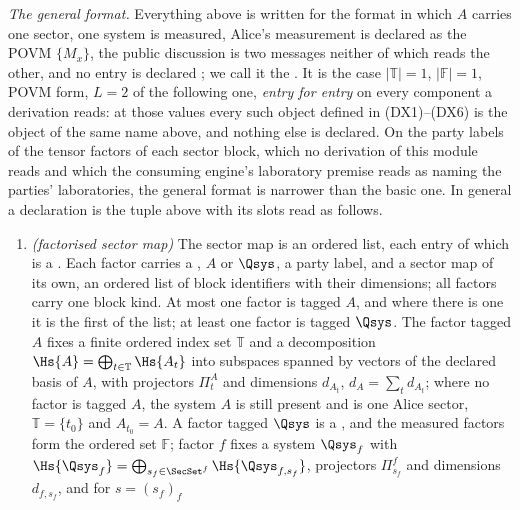 \begin{definition}
\emph{The general format.} Everything above is written for the format in
which $A$ carries one sector, one system is measured, Alice's measurement is
declared as the POVM $\{M_x\}$, the public discussion is two messages neither
of which reads the other, and no entry is declared ; we
call it the
.
It is the case $|\mathbb{T}|=1$, $|\mathbb{F}|=1$, POVM form, $L=2$ of the
following one, \emph{entry for entry} on every component a derivation reads:
at those values every such object defined in (DX1)--(DX6) is the object of
the same name above, and nothing else is declared. On the party labels of the
tensor factors of each sector block, which no derivation of this module reads
and which the consuming engine's laboratory premise reads as naming the
parties' laboratories, the general format is narrower than the basic one. In general a declaration is the
tuple above with its slots read as follows.
\begin{enumerate}[label=(DX\arabic*),leftmargin=3.2em]
\item \emph{(factorised sector map)} The sector map is an ordered list, each
entry of which is a
.
Each factor carries a
,
$A$ or $\Qsys$, a party label, and a sector map of its own, an ordered list of
block identifiers with their dimensions; all factors carry one block kind. At
most one factor is tagged $A$, and where there is one it is the first of the
list; at least one factor is tagged $\Qsys$. The factor tagged $A$ fixes a
finite ordered index set $\mathbb{T}$ and a decomposition
$\Hs{A}=\bigoplus_{t\in\mathbb{T}}\Hs{A_t}$ into subspaces spanned by vectors
of the declared basis of $A$, with projectors $\Pi^{A}_t$ and dimensions
$d_{A_t}$, $d_A=\sum_td_{A_t}$; where no factor is tagged $A$, the system
$A$ is still present and is one Alice sector, $\mathbb{T}=\{t_0\}$ and
$A_{t_0}=A$. A factor tagged $\Qsys$ is a
,
and the measured factors form the ordered set $\mathbb{F}$;
factor $f$ fixes a system $\Qsys_f$ with
$\Hs{\Qsys_f}=\bigoplus_{s_f\in\SecSet^{f}}\Hs{\Qsys_{f,s_f}}$, projectors
$\Pi^{f}_{s_f}$ and dimensions $d_{f,s_f}$, and for $s=(s_f)_{f}$

\end{enumerate}
\end{definition}
